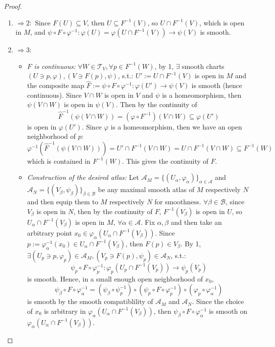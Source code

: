 \begin{proof}
    \begin{enumerate}
        \item $\Rightarrow 2:$ Since $F(U) \subseteq V$, then $U \subseteq F^{-1} (V)$, so $U \cap F^{-1} (V)$, which is open in $M$, and $\psi \circ F\circ \varphi^{-1}: \varphi(U)= \varphi(U \cap F^{-1} (V))\to \psi(V)$ is smooth.
        \item $\Rightarrow 3:$ \begin{itemize}
            \item \textit{$F$ is continuous:} $\forall W\in \mathcal{T}_V, \forall p\in F^{-1} (W)$, by 1, $\exists$ smooth charts $(U\ni p,\varphi), (V\ni F(p), \psi)$, s.t.: $U':= U\cap F^{-1} (V)$ is open in $M$ and the composite map $\widehat{F}:= \psi \circ F\circ \varphi^{-1}:\varphi(U') \to \psi(V)$ is smooth (hence continuous). Since $V\cap W$ is open in $V$ and $\psi$ is a homeomorphism, then $\psi(V\cap W)$ is open in $\psi(V)$. Then by the continuity of 
            \[
            \widehat{F}^{-1} (\psi(V\cap W))= (\varphi \circ F^{-1}) (V\cap W) \subseteq \varphi(U')
            \]
            is open in $\varphi(U')$. Since $\varphi$ is a homeomorphism, then we have an open neighborhood of $p$:
            \[
            \varphi^{-1} (\widehat{F}^{-1}(\psi (V\cap W)))= U'\cap F^{-1} (V\cap W)= U\cap F^{-1} (V\cap W) \subseteq F^{-1} (W)
            \]
            which is contained in $F^{-1}(W)$. This gives the continuity of $F$.

            \item \textit{Construction of the desired atlas:} Let $\mathcal{A}_M= \{(U_\alpha, \varphi_\alpha) \}_{\alpha\in \mathcal{A}}$ and $\mathcal{A}_N =\{(V_\beta, \psi_\beta)\}_{\beta \in \mathcal{B}}$ be any maximal smooth atlas of $M$ respectively $N$ and then equip them to $M$ respectively $N$ for smoothness. $\forall \beta\in \mathcal{B}$, since $V_\beta$ is open in $N$, then by the continuity of $F$, $F^{-1} (V_\beta)$ is open in $U$, so $U_\alpha \cap F^{-1} (V_\beta)$ is open in $M$, $\forall \alpha \in \mathcal{A}$. Fix $\alpha,\beta$ and then take an arbitrary point $x_0 \in \varphi_\alpha (U_\alpha \cap F^{-1} (V_\beta))$. Since $p:= \varphi_\alpha^{-1} (x_0) \in U_\alpha \cap F^{-1} (V_\beta)$, then $F(p) \in V_\beta$. By 1, $\exists (U_p \ni p,\varphi_p) \in \mathcal{A}_M, (V_p\ni F(p), \psi_p) \in \mathcal{A}_N$, s.t.:
            \[
            \psi_p \circ F\circ \varphi_p^{-1}: \varphi_p (U_p \cap F^{-1} (V_p)) \to \psi_p(V_p) 
            \]
            is smooth. Hence, in a small enough open neighborhood of $x_0$,
            \[
            \psi_\beta \circ F\circ \varphi_\alpha^{-1}= (\psi_\beta \circ \psi_p^{-1}) \circ (\psi_p \circ F\circ \varphi_p^{-1}) \circ (\varphi_p \circ \varphi_\alpha^{-1})
            \]
            is smooth by the smooth compatiblility of $\mathcal{A}_M$ and $\mathcal{A}_N$. Since the choice of $x_0$ is arbitrary in $\varphi_\alpha (U_\alpha \cap F^{-1} (V_\beta))$, then $\psi_\beta \circ F\circ \varphi_\alpha^{-1}$ is smooth on $\varphi_\alpha (U_\alpha \cap F^{-1} (V_\beta))$.
        \end{itemize}


\end{enumerate}
\end{proof}
